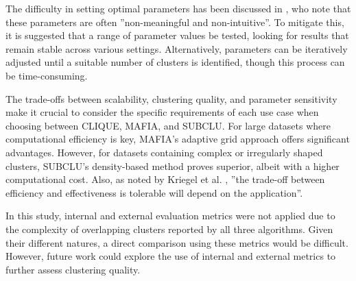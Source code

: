 The difficulty in setting optimal parameters has been discussed in \cite[p.~352]{sim-2012}, who note that these parameters are often ''non-meaningful and non-intuitive''. To mitigate this, it is suggested that a range of parameter values be tested, looking for results that remain stable across various settings. Alternatively, parameters can be iteratively adjusted until a suitable number of clusters is identified, though this process can be time-consuming.

The trade-offs between scalability, clustering quality, and parameter sensitivity make it crucial to consider the specific requirements of each use case when choosing between CLIQUE, MAFIA, and SUBCLU. For large datasets where computational efficiency is key, MAFIA's adaptive grid approach offers significant advantages. However, for datasets containing complex or irregularly shaped clusters, SUBCLU's density-based method proves superior, albeit with a higher computational cost. Also, as noted by Kriegel et al. \cite[p.1:50]{kriegel-2009}, ''the trade-off between efficiency and effectiveness is tolerable will depend on the application''.

In this study, internal and external evaluation metrics were not applied due to the complexity of overlapping clusters reported by all three algorithms. Given their different natures, a direct comparison using these metrics would be difficult. However, future work could explore the use of internal and external metrics to further assess clustering quality.